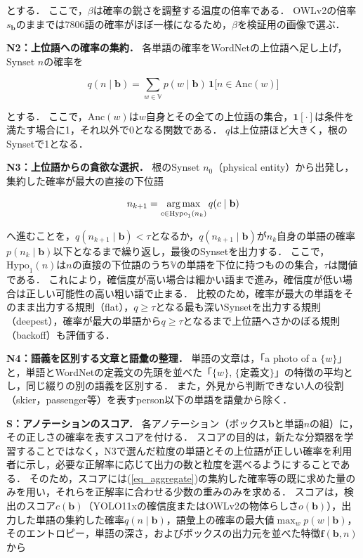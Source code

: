 \noindent
とする．
ここで，$ \beta $は確率の鋭さを調整する温度の倍率である．
OWLv2の倍率$ s_{\mathbf b} $のままでは7806語の確率がほぼ一様になるため，$ \beta $を検証用の画像で選ぶ．

{\bf N2：上位語への確率の集約．}
各単語の確率をWordNetの上位語へ足し上げ，Synset $ n $の確率を

\begin{equation}
    q(n \mid {\mathbf b}) = \sum_{w \in {\mathbb V}} p(w \mid {\mathbf b}) \, {\mathbf 1}\bigl[ n \in \mathrm{Anc}(w) \bigr]
    \label{eq_aggregate}
\end{equation}

\noindent
とする．
ここで，$ \mathrm{Anc}(w) $は$ w $自身とその全ての上位語の集合，$ {\mathbf 1}[\cdot] $は条件を満たす場合に1，それ以外で0となる関数である．
$ q $は上位語ほど大きく，根のSynsetで1となる．

{\bf N3：上位語からの貪欲な選択．}
根のSynset $ n_0 $（physical entity）から出発し，集約した確率が最大の直接の下位語

\begin{equation}
    n_{k+1} = \operatorname*{arg\,max}_{c \in \mathrm{Hypo}_1(n_k)} q(c \mid {\mathbf b})
    \label{eq_greedy}
\end{equation}

\noindent
へ進むことを，$ q(n_{k+1} \mid {\mathbf b}) < \tau $となるか，$ q(n_{k+1} \mid {\mathbf b}) $が$ n_k $自身の単語の確率$ p(n_k \mid {\mathbf b}) $以下となるまで繰り返し，最後のSynsetを出力する．
ここで，$ \mathrm{Hypo}_1(n) $は$ n $の直接の下位語のうち$ {\mathbb V} $の単語を下位に持つものの集合，$ \tau $は閾値である．
これにより，確信度が高い場合は細かい語まで進み，確信度が低い場合は正しい可能性の高い粗い語で止まる．
比較のため，確率が最大の単語をそのまま出力する規則（flat），$ q \geq \tau $となる最も深いSynsetを出力する規則（deepest），確率が最大の単語から$ q \geq \tau $となるまで上位語へさかのぼる規則（backoff）も評価する．

{\bf N4：語義を区別する文章と語彙の整理．}
単語の文章は，「a photo of a $ \{w\} $」と，単語とWordNetの定義文の先頭を並べた「$ \{w\} $, $ \{$定義文$\} $」の特徴の平均とし，同じ綴りの別の語義を区別する．
また，外見から判断できない人の役割（skier，passenger等）を表すperson以下の単語を語彙から除く．

{\bf S：アノテーションのスコア．}
各アノテーション（ボックス$ {\mathbf b} $と単語$ n $の組）に，その正しさの確率を表すスコアを付ける．
スコアの目的は，新たな分類器を学習することではなく，N3で選んだ粒度の単語とその上位語が正しい確率を利用者に示し，必要な正解率に応じて出力の数と粒度を選べるようにすることである．
そのため，スコアには(\ref{eq_aggregate})の集約した確率等の既に求めた量のみを用い，それらを正解率に合わせる少数の重みのみを求める\cite{ref_Platt}．
スコアは，検出のスコア$ c({\mathbf b}) $（YOLO11xの確信度またはOWLv2の物体らしさ$ o({\mathbf b}) $），出力した単語の集約した確率$ q(n \mid {\mathbf b}) $，語彙上の確率の最大値$ \max_w p(w \mid {\mathbf b}) $，そのエントロピー，単語の深さ，およびボックスの出力元を並べた特徴$ {\mathbf f}({\mathbf b}, n) $から


